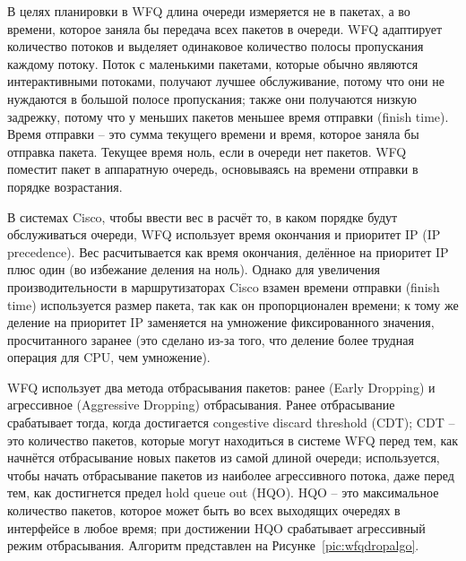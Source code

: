     В целях планировки в WFQ длина очереди измеряется не в пакетах, а во времени,
    которое заняла бы передача всех пакетов в очереди. WFQ адаптирует количество
    потоков и выделяет одинаковое количество полосы пропускания каждому потоку.
    Поток с маленькими пакетами, которые обычно являются интерактивными потоками,
    получают лучшее обслуживание, потому что они не нуждаются в большой полосе пропускания;
    также они получаются низкую задрежку, потому что у меньших пакетов меньшее
    время отправки (finish time). Время отправки -- это сумма текущего времени и
    время, которое заняла бы отправка пакета. Текущее время ноль, если в очереди
    нет пакетов. WFQ поместит пакет в аппаратную очередь, основываясь на времени отправки в
    порядке возрастания.\cite{Vagesna}
	
    В системах Cisco, чтобы ввести вес в расчёт то, в каком порядке будут обслуживаться очереди,
    WFQ использует время окончания и приоритет IP (IP precedence). Вес расчитывается
    как время окончания, делённое на приоритет IP плюс один (во избежание деления
    на ноль). Однако для увеличения производительности в маршрутизаторах Cisco
    взамен времени отправки (finish time) используется размер пакета, так как он
    пропорционален времени; к тому же деление на приоритет IP заменяется на умножение
    фиксированного значения, просчитанного заранее (это сделано из-за того,
    что деление более трудная операция для CPU, чем умножение).\cite{Vagesna}

    WFQ использует два метода отбрасывания пакетов: ранее (Early Dropping) и агрессивное
    (Aggressive Dropping) отбрасывания. Ранее отбрасывание срабатывает тогда, когда
    достигается congestive discard threshold (CDT); CDT -- это количество пакетов, которые могут
    находиться в системе WFQ перед тем, как начнётся отбрасывание новых пакетов
    из самой длиной очереди; используется, чтобы начать отбрасывание пакетов
    из наиболее агрессивного потока, даже перед тем, как достигнется предел
    hold queue out (HQO). HQO -- это максимальное количество пакетов, которое может быть
    во всех выходящих очередях в интерфейсе в любое время; при достижении HQO
    срабатывает агрессивный режим отбрасывания. Алгоритм представлен на Рисунке~\ref{pic:wfqdropalgo}.
    \cite{wfqdrop}

